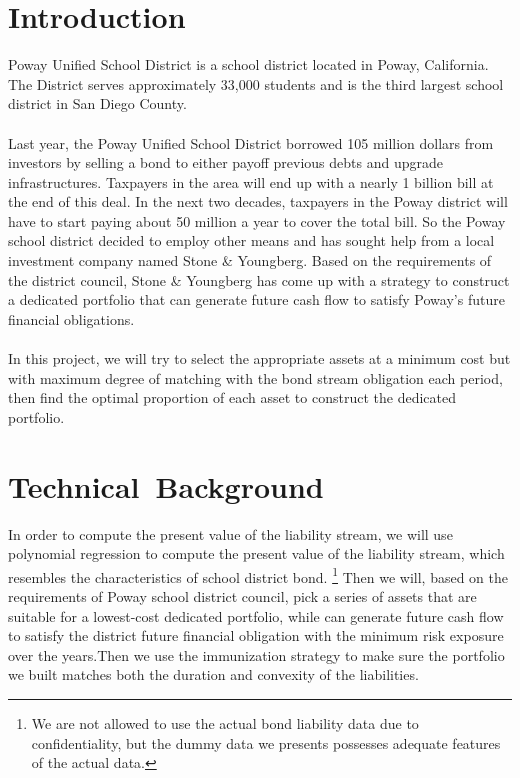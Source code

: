 \documentclass[oneside,12pt]{report}
\begin{document}
\chapter{Introduction}\label{}
%
Poway Unified School District is a school district located in Poway, California. The District serves approximately 33,000 students and is the third largest school district in San Diego County. \\
\\
Last year, the Poway Unified School District borrowed 105 million dollars from investors by selling a bond to either payoff previous debts and upgrade infrastructures. Taxpayers in the area will end up with a nearly 1 billion bill at the end of this deal. In the next two decades, taxpayers in the Poway district will have to start paying about 50 million a year to cover the total bill. So the Poway school district decided to employ other means and has sought help from a local investment company named Stone \& Youngberg.  Based on the requirements of the district  council, Stone \& Youngberg has come up with a strategy to construct a dedicated portfolio that can generate future cash flow to satisfy Poway's future financial obligations. \\
\\
In this project, we will try to select the appropriate assets at a minimum cost but with maximum degree of matching with the bond stream obligation each period, then find the optimal proportion of each asset to construct the dedicated portfolio.

\chapter{Technical~Background}\label{}
%
In order to compute the present value of the liability stream, we will use polynomial regression to compute the present value of the liability stream, which resembles the characteristics of school district bond. 
\footnote{We are not allowed to use the actual bond liability data due to confidentiality, but the dummy data we presents possesses adequate features of the actual data.}
Then we will, based on the requirements of Poway school district council, pick a series of assets that are suitable for a lowest-cost dedicated portfolio, while can generate future cash flow to satisfy the  district future financial obligation with the minimum risk exposure over the years.Then we use the immunization strategy to make sure the portfolio we built matches both the duration and convexity of the liabilities.
\end{document}
